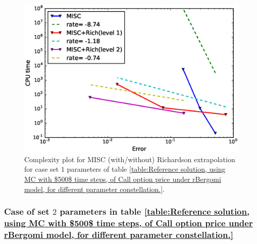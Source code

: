 \begin{figure}[h!]
	\centering
	\includegraphics[width=0.4\linewidth]{./figures/rBergomi_Complexity_rates/set1/error_vs_time_set1_comparison}
	
	\caption{Complexity plot for  MISC (with/without) Richardson extrapolation for case set $1$ parameters of table \ref{table:Reference solution, using MC with $500$ time steps, of Call option price under rBergomi model, for different parameter constellation.}.}
	\label{fig:Complexity plot for  MISC for Case set $1$ parameters, comparison}
\end{figure}







\subsubsection{Case of set $2$ parameters in table \ref{table:Reference solution, using MC with $500$ time steps, of Call option price under rBergomi model, for different parameter constellation.} }
\label{sec:Case of set $2$ parameters_linear}

